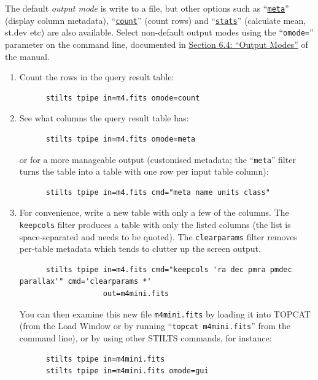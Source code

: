 \documentclass{article}
\newcommand{\bhref}[2]{\href{#1}{{\color{blue}#2}}}
\newcommand{\stiltsmanref}[2]
               {\bhref{http://www.starlink.ac.uk/stilts/sun256/#1.html}{#2}}
\begin{document}
The default {\em output mode\/} is write to a file,
but other options such as
``\stiltsmanref{mode-meta}{\texttt{meta}}'' (display column metadata),
``\stiltsmanref{mode-count}{\texttt{count}}'' (count rows) and
``\stiltsmanref{mode-stats}{\texttt{stats}}'' (calculate mean, st.dev etc)
are also available.
Select non-default output modes using the ``{\tt omode=}'' parameter
on the command line, documented in
\stiltsmanref{outModes}{Section 6.4: ``Output Modes''} of the manual.

\begin{enumerate}
\item Count the rows in the query result table:
      \preverb
      \begin{verbatim}
      stilts tpipe in=m4.fits omode=count
      \end{verbatim}
      \postverb
\item See what columns the query result table has:
      \preverb
      \begin{verbatim}
      stilts tpipe in=m4.fits omode=meta
      \end{verbatim}
      \postverb
      or for a more manageable output
      (customised metadata; the ``{\tt meta}'' filter turns the table
      into a table with one row per input table column):
      \preverb
      \begin{verbatim}
      stilts tpipe in=m4.fits cmd="meta name units class"
      \end{verbatim}
      \postverb
\item For convenience, write a new table with only a few of the columns.
      The {\tt keepcols} filter produces a table with only the listed
      columns (the list is space-separated and needs to be quoted).
      The {\tt clearparams} filter removes per-table metadata
      which tends to clutter up the screen output.
      \preverb
      \begin{verbatim}
      stilts tpipe in=m4.fits cmd="keepcols 'ra dec pmra pmdec parallax'" cmd='clearparams *'
                   out=m4mini.fits
      \end{verbatim}
      \postverb
      You can then examine this new file {\tt m4mini.fits}
      by loading it into TOPCAT
      (from the Load Window or by running ``{\tt topcat m4mini.fits}''
      from the command line), or by using other STILTS commands, for instance:
      \preverb
      \begin{verbatim}
      stilts tpipe in=m4mini.fits
      stilts tpipe in=m4mini.fits omode=gui
      \end{verbatim}

\end{enumerate}
\end{document}

